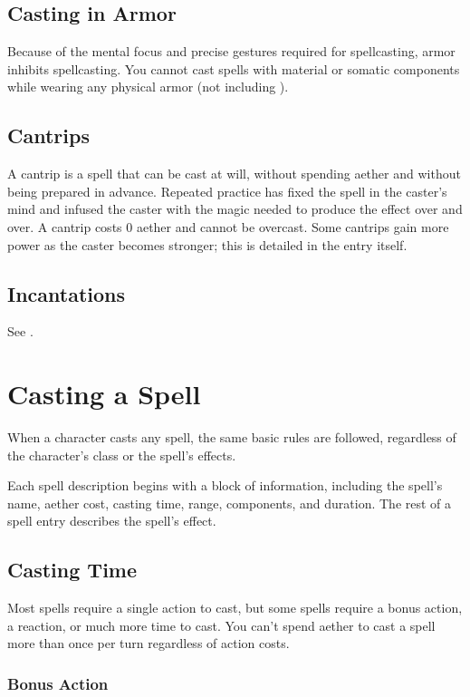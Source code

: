 \subsection{Casting in Armor}
Because of the mental focus and precise gestures required for spellcasting, armor inhibits spellcasting. You cannot cast spells with material or somatic components while wearing any physical armor (not including ).

\subsection{Cantrips}

A cantrip is a spell that can be cast at will, without spending aether and without being prepared in advance. Repeated practice has fixed the spell in the caster's mind and infused the caster with the magic needed to produce the effect over and over. A cantrip costs 0 aether and cannot be overcast. Some cantrips gain more power as the caster becomes stronger; this is detailed in the entry itself.

\subsection{Incantations}
See .

\section{Casting a Spell}

When a character casts any spell, the same basic rules are followed, regardless of the character's class or the spell's effects.

Each spell description begins with a block of information, including the spell's name, aether cost, casting time, range, components, and duration. The rest of a spell entry describes the spell's effect.

\subsection{Casting Time}

Most spells require a single action to cast, but some spells require a bonus action, a reaction, or much more time to cast. You can't spend aether to cast a spell more than once per turn regardless of action costs.

\subsubsection{Bonus Action}

